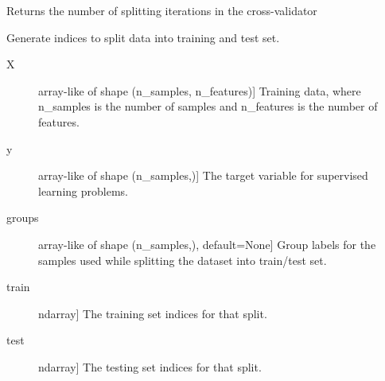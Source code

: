 \documentclass[letterpaper,10pt,english]{sphinxmanual}
\begin{document}
\begin{fulllineitems}
\begin{fulllineitems}
\label{\detokenize{api/mastml.data_splitters.LeaveOutTwinCV:mastml.data_splitters.LeaveOutTwinCV.get_n_splits}}
Returns the number of splitting iterations in the cross-validator

\end{fulllineitems}


\begin{fulllineitems}
\label{\detokenize{api/mastml.data_splitters.LeaveOutTwinCV:mastml.data_splitters.LeaveOutTwinCV.split}}
Generate indices to split data into training and test set.
\begin{description}
\item[{X}] \leavevmode{[}array-like of shape (n\_samples, n\_features){]}
Training data, where n\_samples is the number of samples
and n\_features is the number of features.

\item[{y}] \leavevmode{[}array-like of shape (n\_samples,){]}
The target variable for supervised learning problems.

\item[{groups}] \leavevmode{[}array-like of shape (n\_samples,), default=None{]}
Group labels for the samples used while splitting the dataset into
train/test set.

\end{description}
\begin{description}
\item[{train}] \leavevmode{[}ndarray{]}
The training set indices for that split.

\item[{test}] \leavevmode{[}ndarray{]}
The testing set indices for that split.

\end{description}

\end{fulllineitems}


\end{fulllineitems}
\end{document}
